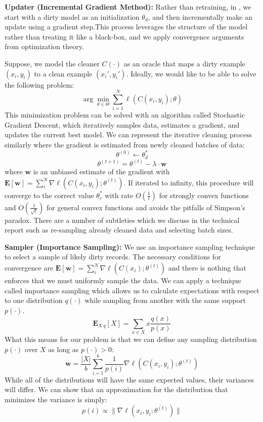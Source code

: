   \noindent\textbf{Updater (Incremental Gradient Method): } Rather than retraining, in \sys, we start with a dirty model as an initialization $\theta_d$, and then incrementally make an update using a gradient step.This process leverages the structure of the model rather than treating it like a black-box, and we apply convergence arguments from optimization theory.

Suppose, we model the cleaner $C(\cdot)$ as an oracle that maps a dirty example $(x_i,y_i)$ to a clean example $(x_i',y_i')$.
Ideally, we would like to be able to solve the following problem:
\[
\arg\min_{\theta \in \Theta} \sum_{i=1}^N \ell(C(x_i,y_i);\theta)
\]
This minimization problem can be solved with an algorithm called Stochastic Gradient Descent, which iteratively samples data, estimates a gradient, and updates the current best model.
We can represent the iterative cleaning process similarly where the gradient is estimated from newly cleaned batches of data:
\[
\theta^{(0)} \leftarrow \theta_d^{*}
\]
\[
\theta^{(t+1)} = \theta^{(t)} - \lambda \cdot \mathbf{w}
\]
where $\mathbf{w}$ is an unbiased estimate of the gradient with $\mathbf{E}[\mathbf{w}]=\sum_i^N\nabla \ell(C(x_i,y_i);\theta^{(t)})$.
If iterated to infinity, this procedure will converge to the correct value $\theta_c^*$ with rate $O(\frac{1}{t})$ for strongly convex functions and $O(\frac{1}{\sqrt{t}})$ for general convex functions and avoids the pitfalls of Simpson's paradox.
There are a number of subtleties which we discuss in the technical report such as re-sampling already cleaned data and selecting batch sizes. 

  \vspace{0.5em}

  \noindent\textbf{Sampler (Importance Sampling): } We use an importance sampling technique to select a sample of likely dirty records. The necessary conditions for convergence are $\mathbf{E}[\mathbf{w}]=\sum_i^N\nabla \ell(C(x_i);\theta^{(t)})$ and there is nothing that enforces that we must uniformly sample the data.
We can apply a technique called importance sampling which allows us to calculate expectations with respect to one distribution $q(\cdot)$ while sampling from another with the same support $p(\cdot)$. 
\[\mathbf{E}_{X~q}[X] = \sum_{x \in X} x \frac{q(x)}{p(x)} \]
What this means for our problem is that we can define any sampling distribution $p(\cdot)$ over $X$ as long as $p(\cdot) > 0$:
\[
\mathbf{w} = \frac{|X|}{b} \sum_{i=1}^{b} \frac{1}{p(i)} \nabla\ell(C(x_i,y_i);\theta^{(t)})
\]
While all of the distributions will have the same expected values, their variances will differ.
We can show that an approximation for the distribution that minimizes the variance is simply:
\[
p(i) \propto \|\nabla\ell(x_i,y_i;\theta^{(t)})\|
\]